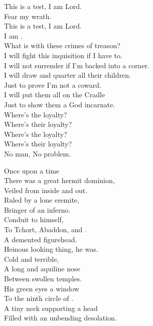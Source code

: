 This is a test, I am Lord. \\
Fear my wrath. \\
This is a test, I am Lord. \\
I am . \\

What is with these crimes of treason? \\
I will fight this inquisition if I have to. \\
I will not surrender if I'm backed into a corner. \\
I will draw and quarter all their children. \\
Just to prove I'm not a coward. \\
I will put them all on the  Cradle \\
Just to show them a God incarnate. \\

Where's the loyalty? \\
Where's their loyalty? \\
Where's the loyalty? \\
Where's their loyalty? \\
No man, No problem. \\





Once upon a time \\
There was a great hermit dominion, \\
Veiled from inside and out. \\
Ruled by a lone eremite, \\
Bringer of an inferno. \\
Conduit to  himself, \\
To Tchort, Abaddon, and . \\
A demented figurehead. \\

Heinous looking thing, he was. \\
Cold and terrible, \\
A long and aquiline nose \\
Between swollen temples. \\
His green eyes a window \\
To the ninth circle of . \\
A tiny neck supporting a head \\
Filled with an unbending desolation. \\

